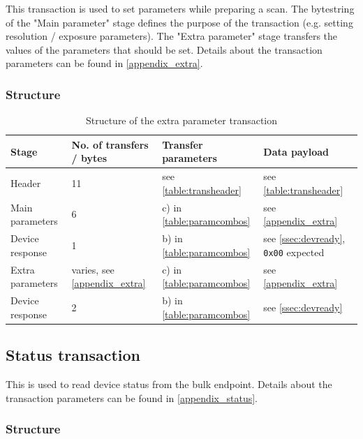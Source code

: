 \documentclass{article}
\begin{document}
This transaction is used to set parameters while preparing a scan.
The bytestring of the "Main parameter" stage defines the purpose of the transaction
(e.g. setting resolution / exposure parameters). The "Extra parameter" stage
transfers the values of the parameters that should be set.
Details about the transaction parameters can be found in \autoref{appendix_extra}.

\subsubsection{Structure}

\begin{table}[H]
  \caption{Structure of the extra parameter transaction}
  \centering
  \begin{tabularx}{\textwidth}{X|X|X|X}
    Stage & No. of transfers / bytes & Transfer parameters & Data payload \\ \hline
    
    Header & 11 & see \autoref{table:transheader} & see \autoref{table:transheader} \\
    Main parameters & 6 & c) in \autoref{table:paramcombos} & see \autoref{appendix_extra} \\
    Device response & 1 & b) in \autoref{table:paramcombos} & see \autoref{ssec:devready}, {\tt 0x00} expected \\
    Extra parameters & varies, see \autoref{appendix_extra} & c) in \autoref{table:paramcombos} & see \autoref{appendix_extra} \\
    Device response & 2 & b) in \autoref{table:paramcombos} & see \autoref{ssec:devready} \\
  \end{tabularx}
\end{table}

\subsection{Status transaction}
\label{ssec:read_trans}

This is used to read device status from the bulk endpoint.
Details about the transaction parameters can be found in \autoref{appendix_status}.

\subsubsection{Structure}
\end{document}
